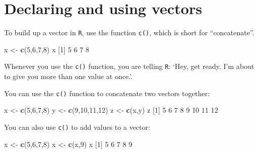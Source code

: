 \documentclass[
]{book}
\newenvironment{Shaded}{\begin{snugshade}}{\end{snugshade}}
\newcommand{\DecValTok}[1]{\textcolor[rgb]{0.00,0.00,0.81}{#1}}
\newcommand{\KeywordTok}[1]{\textcolor[rgb]{0.13,0.29,0.53}{\textbf{#1}}}
\newcommand{\NormalTok}[1]{#1}
\newcommand{\StringTok}[1]{\textcolor[rgb]{0.31,0.60,0.02}{#1}}
\begin{document}
\hypertarget{declaring-and-using-vectors}{%
\section*{Declaring and using vectors}\label{declaring-and-using-vectors}}

To build up a vector in \texttt{R}, use the function \texttt{c()}, which is short for ``concatenate''.

\begin{Shaded}
\begin{Highlighting}[]
\NormalTok{x <-}\StringTok{ }\KeywordTok{c}\NormalTok{(}\DecValTok{5}\NormalTok{,}\DecValTok{6}\NormalTok{,}\DecValTok{7}\NormalTok{,}\DecValTok{8}\NormalTok{)}
\NormalTok{x}
\NormalTok{[}\DecValTok{1}\NormalTok{] }\DecValTok{5} \DecValTok{6} \DecValTok{7} \DecValTok{8}
\end{Highlighting}
\end{Shaded}

Whenever you use the \texttt{c()} function, you are telling \texttt{R}: `Hey, get ready. I'm about to give you more than one value at once.'.

You can use the \texttt{c()} function to concatenate two vectors together:

\begin{Shaded}
\begin{Highlighting}[]
\NormalTok{x <-}\StringTok{ }\KeywordTok{c}\NormalTok{(}\DecValTok{5}\NormalTok{,}\DecValTok{6}\NormalTok{,}\DecValTok{7}\NormalTok{,}\DecValTok{8}\NormalTok{)}
\NormalTok{y <-}\StringTok{ }\KeywordTok{c}\NormalTok{(}\DecValTok{9}\NormalTok{,}\DecValTok{10}\NormalTok{,}\DecValTok{11}\NormalTok{,}\DecValTok{12}\NormalTok{)}
\NormalTok{z <-}\StringTok{ }\KeywordTok{c}\NormalTok{(x,y)}
\NormalTok{z}
\NormalTok{[}\DecValTok{1}\NormalTok{]  }\DecValTok{5}  \DecValTok{6}  \DecValTok{7}  \DecValTok{8}  \DecValTok{9} \DecValTok{10} \DecValTok{11} \DecValTok{12}
\end{Highlighting}
\end{Shaded}

You can also use \texttt{c()} to add values to a vector:

\begin{Shaded}
\begin{Highlighting}[]
\NormalTok{x <-}\StringTok{ }\KeywordTok{c}\NormalTok{(}\DecValTok{5}\NormalTok{,}\DecValTok{6}\NormalTok{,}\DecValTok{7}\NormalTok{,}\DecValTok{8}\NormalTok{)}
\NormalTok{x <-}\StringTok{ }\KeywordTok{c}\NormalTok{(x,}\DecValTok{9}\NormalTok{)}
\NormalTok{x}
\NormalTok{[}\DecValTok{1}\NormalTok{] }\DecValTok{5} \DecValTok{6} \DecValTok{7} \DecValTok{8} \DecValTok{9}
\end{Highlighting}
\end{Shaded}
\end{document}
